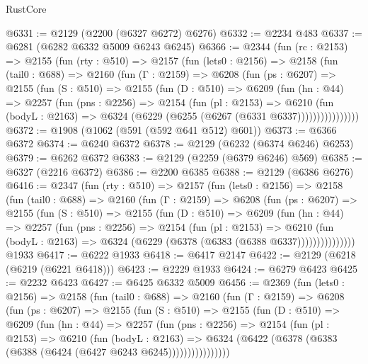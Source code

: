 \begin{lexlean}{RustCore}
\begin{coremodule}
@6331 := @2129 (@2200 (@6327 @6272) @6276)
@6332 := @2234 @483
@6337 := @6281 (@6282 @6332 @5009 @6243 @6245)
@6366 := @2344
    (fun (rc : @2153) =>
    @2155
      (fun (rty : @510) =>
      @2157
        (fun (lets0 : @2156) =>
        @2158
          (fun (tail0 : @688) =>
          @2160
            (fun (Γ : @2159) =>
            @6208
              (fun (ps : @6207) =>
              @2155
                (fun (S : @510) =>
                @2155
                  (fun (D : @510) =>
                  @6209
                    (fun (hn : @44) =>
                    @2257
                      (fun (pns : @2256) =>
                      @2154
                        (fun (pl : @2153) =>
                        @6210
                          (fun (bodyL : @2163) =>
                          @6324 (@6229 (@6255 (@6267 (@6331 @6337))))))))))))))))
@6372 := @1908 (@1062 (@591 (@592 @641 @512) @601))
@6373 := @6366 @6372
@6374 := @6240 @6372
@6378 := @2129 (@6232 (@6374 @6246) @6253)
@6379 := @6262 @6372
@6383 := @2129 (@2259 (@6379 @6246) @569)
@6385 := @6327 (@2216 @6372)
@6386 := @2200 @6385
@6388 := @2129 (@6386 @6276)
@6416 := @2347
    (fun (rty : @510) =>
    @2157
      (fun (lets0 : @2156) =>
      @2158
        (fun (tail0 : @688) =>
        @2160
          (fun (Γ : @2159) =>
          @6208
            (fun (ps : @6207) =>
            @2155
              (fun (S : @510) =>
              @2155
                (fun (D : @510) =>
                @6209
                  (fun (hn : @44) =>
                  @2257
                    (fun (pns : @2256) =>
                    @2154
                      (fun (pl : @2153) =>
                      @6210
                        (fun (bodyL : @2163) =>
                        @6324 (@6229 (@6378 (@6383 (@6388 @6337)))))))))))))))
    @1933
@6417 := @6222 @1933
@6418 := @6417 @2147
@6422 := @2129 (@6218 (@6219 (@6221 @6418)))
@6423 := @2229 @1933
@6424 := @6279 @6423
@6425 := @2232 @6423
@6427 := @6425 @6332 @5009
@6456 := @2369
    (fun (lets0 : @2156) =>
    @2158
      (fun (tail0 : @688) =>
      @2160
        (fun (Γ : @2159) =>
        @6208
          (fun (ps : @6207) =>
          @2155
            (fun (S : @510) =>
            @2155
              (fun (D : @510) =>
              @6209
                (fun (hn : @44) =>
                @2257
                  (fun (pns : @2256) =>
                  @2154
                    (fun (pl : @2153) =>
                    @6210
                      (fun (bodyL : @2163) =>
                      @6324 (@6422 (@6378 (@6383 (@6388 (@6424 (@6427 @6243 @6245))))))))))))))))

\end{coremodule}
\end{lexlean}
